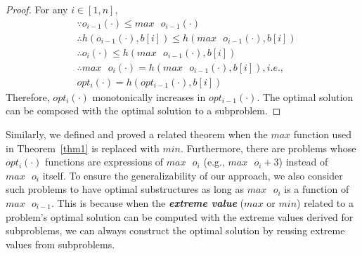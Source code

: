 \begin{proof}
For any $i\in[1, n]$, 
\begin{align}
    &\because o_{i-1}(\cdot) \le max \text{ }o_{i-1}(\cdot) \nonumber\\
    & \therefore h(o_{i-1}(\cdot), b[i])\le h(max \text{ }o_{i-1}(\cdot), b[i]) \nonumber\\
     &\therefore o_i(\cdot) \le h(max \text{ }o_{i-1}(\cdot), b[i])\nonumber\\ %
     &\therefore max\text{ }o_i(\cdot)=h(max \text{ }o_{i-1}(\cdot), b[i]), i.e.,  \nonumber \\
     & opt_i(\cdot)=h(opt_{i-1}(\cdot), b[i]) \nonumber
\end{align}
Therefore, $opt_i(\cdot)$ monotonically increases in $opt_{i-1}(\cdot)$. The optimal solution can be composed with the optimal solution to a subproblem. \qedhere  
\end{proof}

Similarly, we defined and proved a related theorem when the $max$ function used in Theorem~\ref{thm1} is replaced with $min$. Furthermore, there are problems whose $opt_i(\cdot)$ functions are expressions of $max\text{ }o_i$ (e.g., $max\text{ }o_i+3$) instead of $max\text{ }o_i$ itself. 
To ensure the generalizability of our approach, we also consider such problems 
to have optimal substructures as long as $max\text{ }o_i$ is a function of $max\text{ }o_{i-1}$. 
This is because when the \textbf{\emph{extreme value}} ($max$ or $min$) related to a problem's optimal solution can be computed 
with the extreme values derived for subproblems,
we can always construct the optimal solution by reusing extreme values from subproblems. 

